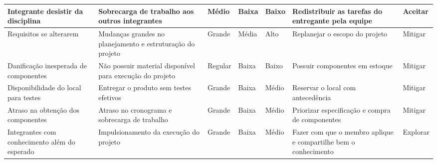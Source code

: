 \begin{table}[!htbp]
{\begin{tabular}{|p{3cm}|p{3cm}|p{3cm}|p{3cm}|p{3cm}|p{3cm}|p{3cm}|}
    Integrante desistir da disciplina                   & Sobrecarga de trabalho aos outros integrantes                              & Médio            & Baixa                  & Baixo                & Redistribuir as tarefas do entregante pela equipe                                                                                                    & Aceitar             \\ \hline
    Requisitos se alterarem                             & Mudanças grandes no planejamento e estruturação do projeto                 & Grande           & Média                  & Alto                 & Replanejar o escopo do projeto                                                                                                                       & Mitigar             \\ \hline
    Danificação inesperada de componentes               & Não possuir material disponível para execução do projeto                   & Regular          & Baixa                  & Baixo                & Possuir componentes em estoque                                                                                                                       & Mitigar             \\ \hline
    Disponibilidade do local para testes                & Entregar o produto sem testes efetivos                                     & Grande           & Baixa                  & Médio                & Reservar o local com antecedência                                                                                                                    & Mitigar             \\ \hline
    Atraso na obtenção dos componentes                  & Atraso no cronograma e sobrecarga de trabalho                              & Grande           & Baixa                  & Médio                & Priorizar especificação e compra de componentes                                                                                                      & Mitigar             \\ \hline
    Integrantes com conhecimento além do esperado       & Impulsionamento da execução do projeto                                     & Grande           & Baixa                  & Médio                & Fazer com que o membro aplique e compartilhe bem o conhecimento                                                                                      & Explorar            \\ \hline
    \end{tabular}%
    }
  \end{table}
